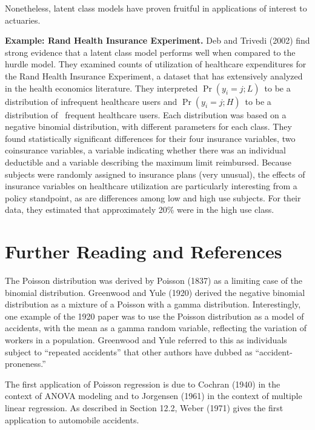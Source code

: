 {Nonetheless, latent class models have proven fruitful in
applications of interest to actuaries.

\linejed{}

\textbf{Example: Rand Health Insurance Experiment.} Deb and Trivedi (2002) find strong
evidence that a latent class model performs well when compared to
the hurdle model. They examined counts of utilization of healthcare
expenditures for the Rand Health Insurance Experiment, a dataset
that has extensively analyzed in the health economics literature.
They interpreted $\Pr \left( y_i=j;L\right) $\ to be a distribution
of infrequent healthcare users and $\Pr \left( y_i=j;H\right) $\ to
be a distribution of \ frequent healthcare users. Each distribution
was based on a negative binomial distribution, with different
parameters for each class. They found statistically significant
differences for their four insurance variables, two coinsurance
variables, a variable indicating whether there was an individual
deductible and a variable describing the maximum limit reimbursed.
Because subjects were randomly assigned to insurance plans (very
unusual), the effects of insurance variables on healthcare
utilization are particularly interesting from a policy standpoint,
as are differences among low and high use subjects. For their data,
they estimated that approximately 20\% were in the high use class.

\linejed

\section{Further Reading and References}

The Poisson distribution was derived by Poisson (1837) as a limiting
case of the binomial distribution. Greenwood and Yule (1920) derived
the negative binomial distribution as a mixture of a Poisson with a
gamma distribution. Interestingly, one example of the 1920 paper was
to use the Poisson distribution as a model of accidents, with the
mean as a gamma random variable, reflecting the variation of workers
in a population. Greenwood and Yule referred to this as individuals
subject to ``repeated accidents'' that other authors have dubbed as
``accident-proneness.''

The first application of Poisson regression is due to Cochran (1940)
in the context of ANOVA modeling and to Jorgensen (1961) in the
context of multiple linear regression. As described in Section 12.2,
Weber (1971) gives the first application to automobile accidents.

}
